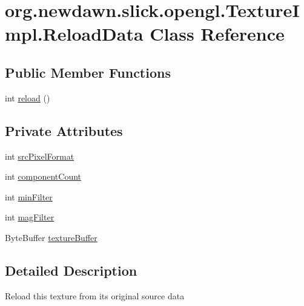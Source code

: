 \hypertarget{classorg_1_1newdawn_1_1slick_1_1opengl_1_1_texture_impl_1_1_reload_data}{}\section{org.\+newdawn.\+slick.\+opengl.\+Texture\+Impl.\+Reload\+Data Class Reference}
\label{classorg_1_1newdawn_1_1slick_1_1opengl_1_1_texture_impl_1_1_reload_data}
\subsection*{Public Member Functions}
\begin{DoxyCompactItemize}
\item 
int \mbox{\hyperlink{classorg_1_1newdawn_1_1slick_1_1opengl_1_1_texture_impl_1_1_reload_data_a9aa3b4822b2ecf2bdd34e0e5d1df9c46}{reload}} ()
\end{DoxyCompactItemize}
\subsection*{Private Attributes}
\begin{DoxyCompactItemize}
\item 
int \mbox{\hyperlink{classorg_1_1newdawn_1_1slick_1_1opengl_1_1_texture_impl_1_1_reload_data_a174e77c29132037a4d4a634ec08cabd0}{src\+Pixel\+Format}}
\item 
int \mbox{\hyperlink{classorg_1_1newdawn_1_1slick_1_1opengl_1_1_texture_impl_1_1_reload_data_ac4fd20a95b32ccb61b7a87127d56af7b}{component\+Count}}
\item 
int \mbox{\hyperlink{classorg_1_1newdawn_1_1slick_1_1opengl_1_1_texture_impl_1_1_reload_data_a2bda7bd341fa651a6be485f893e95ed4}{min\+Filter}}
\item 
int \mbox{\hyperlink{classorg_1_1newdawn_1_1slick_1_1opengl_1_1_texture_impl_1_1_reload_data_ad77e258620f00922337a119e09db0c7a}{mag\+Filter}}
\item 
Byte\+Buffer \mbox{\hyperlink{classorg_1_1newdawn_1_1slick_1_1opengl_1_1_texture_impl_1_1_reload_data_afd42846541be05f57d9bca24c04b52b8}{texture\+Buffer}}
\end{DoxyCompactItemize}


\subsection{Detailed Description}
Reload this texture from it\textquotesingle{}s original source data 

